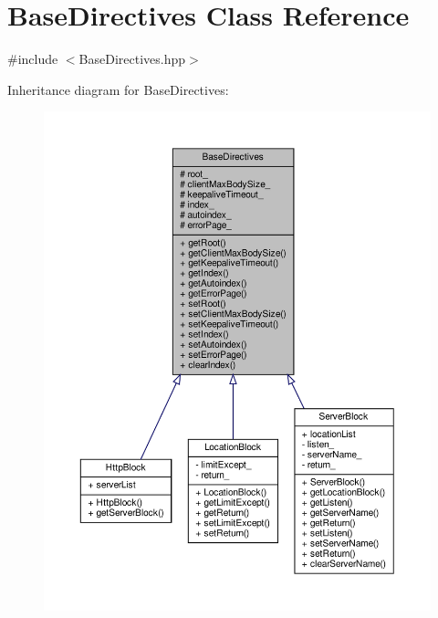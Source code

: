 \hypertarget{classft_1_1_base_directives}{}\section{Base\+Directives Class Reference}
\label{classft_1_1_base_directives}


{\ttfamily \#include $<$Base\+Directives.\+hpp$>$}



Inheritance diagram for Base\+Directives\+:
\nopagebreak
\begin{figure}[H]
\begin{center}
\leavevmode
\includegraphics[width=350pt]{classft_1_1_base_directives__inherit__graph}
\end{center}
\end{figure}


